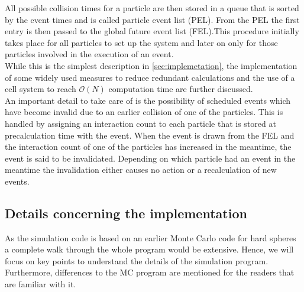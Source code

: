 All possible collision times for a particle are then stored in a queue that is sorted by the event times and is called particle event list (PEL). From the PEL the first entry is then passed to the global future event list (FEL).This procedure initially takes place for all particles to set up the system and later on only for those particles involved in the execution of an event.\\

While this is the simplest description in \autoref{sec:implemetation}, the implementation of some widely used measures to reduce redundant calculations and the use of a cell system to reach $\mathcal{O}(N)$ computation time are further discussed.\\

An important detail to take care of is the possibility of scheduled events which have become invalid due to an earlier collision of one of the particles. This is handled by assigning an interaction count to each particle that is stored at precalculation time with the event. When the event is drawn from the FEL and the interaction count of one of the particles has increased in the meantime, the event is said to be invalidated. Depending on which particle had an event in the meantime the invalidation either causes no action or a recalculation of new events.

\subsection{Details concerning the implementation} 
\label{sec:implemetation}
As the simulation code is based on an earlier Monte Carlo code for hard spheres a complete walk through the whole program would be extensive. Hence, we will focus on key points to understand the details of the simulation program. Furthermore, differences to the MC program are mentioned for the readers that are familiar with it.

